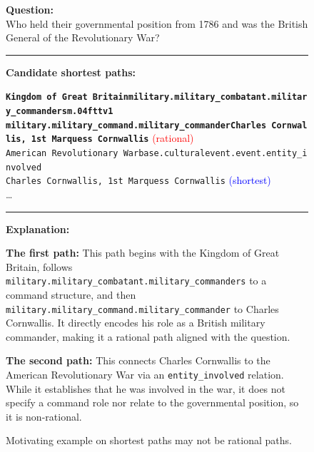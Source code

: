 \begin{figure}[t]
\begin{tcolorbox}[colback=gray!5!white,
                  colframe=gray!75!black,
                  title=WebQTrn-934\_02aae167a8fa9f7d45daab265ac650cd]
\scriptsize

\textbf{Question:}\\
Who held their governmental position from 1786 and was the British General of the Revolutionary War?

\rule{\linewidth}{0.4pt}

\textbf{Candidate shortest paths:}\\[2pt]
{\raggedright
\texttt{\textbf{Kingdom of Great Britain\patharrow military.military\_combatant.military\_commanders\patharrow m.04fttv1 \\ \patharrow military.military\_command.military\_commander\patharrow Charles Cornwallis, 1st Marquess Cornwallis}}\hfill
\textcolor{red}{(rational)}\\[6pt]

\texttt{American Revolutionary War\patharrow base.culturalevent.event.entity\_involved \\ \patharrow Charles Cornwallis, 1st Marquess Cornwallis}\hfill
\textcolor{blue}{(shortest)}
\\[6pt]
\ldots
\par}

\rule{\linewidth}{0.4pt}

\textbf{Explanation:}\\[2pt]
{\raggedright
\textbf{The first path:} This path begins with the Kingdom of Great Britain, follows \texttt{military.military\_combatant.military\_commanders} to a command structure, and then \texttt{military.military\_command.military\_commander} to Charles Cornwallis. It directly encodes his role as a British military commander, making it a rational path aligned with the question.\par\vspace{6pt}

\textbf{The second path:} This connects Charles Cornwallis to the American Revolutionary War via an \texttt{entity\_involved} relation. While it establishes that he was involved in the war, it does not specify a command role nor relate to the governmental position, so it is non-rational.
\par}

\end{tcolorbox}
\caption{Motivating example on shortest paths may not be rational paths.}
\label{fig:type2_no2}
\end{figure}


